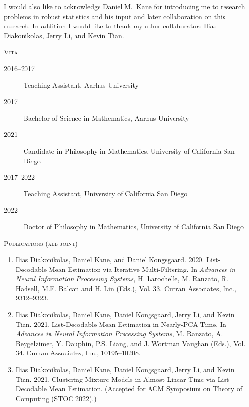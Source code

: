 \documentclass[letterpaper,oneside,english,11pt,openany]{memoir}
\begin{document}
I would also like to acknowledge Daniel M.\ Kane for introducing me to research problems in robust statistics and his input and later collaboration on this research. In addition I would like to thank my other collaborators Ilias Diakonikolas, Jerry Li, and Kevin Tian.

\clearpage



\begin{center}
  \Large\scshape Vita
\end{center}
\begin{description}
  \item[2016--2017] Teaching Assistant, Aarhus University
  \item[2017] Bachelor of Science in Mathematics, Aarhus University
  \item[2021] Candidate in Philosophy in Mathematics, University of California San Diego
  \item[2017--2022] Teaching Assistant, University of California San Diego
  \item[2022] Doctor of Philosophy in Mathematics, University of California San Diego
\end{description}

\begin{center}
  \Large\scshape Publications (all joint)
\end{center}
\begin{enumerate}[$\bullet$]
  \item Ilias Diakonikolas, Daniel Kane, and Daniel Kongsgaard. 2020. List-Decodable Mean Estimation via Iterative Multi-Filtering. In \emph{Advances in Neural Information Processing Systems}, H. Larochelle, M. Ranzato, R. Hadsell, M.F. Balcan and H. Lin (Eds.), Vol. 33. Curran Associates, Inc., 9312--9323.

  \item Ilias Diakonikolas, Daniel Kane, Daniel Kongsgaard, Jerry Li, and Kevin Tian. 2021. List-Decodable Mean Estimation in Nearly-PCA Time. In \emph{Advances in Neural Information Processing Systems}, M. Ranzato, A. Beygelzimer, Y. Dauphin, P.S. Liang, and J. Wortman Vaughan (Eds.), Vol. 34. Curran Associates, Inc., 10195--10208.

  \item Ilias Diakonikolas, Daniel Kane, Daniel Kongsgaard, Jerry Li, and Kevin Tian. 2021. Clustering Mixture Models in Almost-Linear Time via List-Decodable Mean Estimation. (Accepted for ACM Symposium on Theory of Computing (STOC 2022).)
\end{enumerate}
\end{document}
